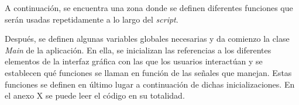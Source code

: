 \documentclass[11pt,a4paper,twoside]{book}
\begin{document}
                A continuación, se encuentra una zona donde se definen diferentes funciones que serán usadas repetidamente a lo largo del \textit{script}. 
                
                Después, se definen algunas variables globales necesarias y da comienzo la clase \textit{Main} de la aplicación. En ella, se inicializan las referencias a los diferentes elementos de la interfaz gráfica con las que los usuarios interactúan y se establecen qué funciones se llaman en función de las señales que manejan. Estas funciones se definen en último lugar a continuación de dichas inicializaciones. En el anexo X se puede leer el código en su totalidad.
               
        


\end{document}
